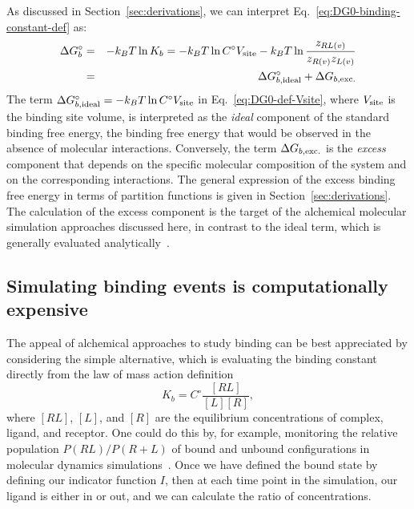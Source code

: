 \documentclass[9pt,bestpractices]{livecoms}
\begin{document}
As discussed in Section~\ref{sec:derivations}, we can interpret Eq.~\ref{eq:DG0-binding-constant-def} as: 
\begin{eqnarray}
  \Delta G^\circ_b &=&  - k_B T \ln K_b = - k_B T \ln C^\circ V_{\rm site} - k_B T \ln \frac{z_{RL(v)}}{z_{R(v)} z_{L(v)}} \\
{\rm \ }  &=& \Delta G^\circ_{b,{\rm ideal}} + \Delta G_{b,{\rm exc.}} \label{eq:DG0-def-Vsite}
\end{eqnarray}
The term $\Delta G^\circ_{b,{\rm ideal}} = - k_B T \ln C^\circ V_{\rm site}$ in Eq.~\ref{eq:DG0-def-Vsite}, where $V_{\rm site}$ is the binding site volume,   is interpreted as the \emph{ideal} component of the standard binding free energy, the binding free energy that would be observed in the absence of molecular interactions. Conversely, the term $\Delta G_{b,{\rm exc.}}$ is the \emph{excess} component that depends on the specific molecular composition of the system and on the corresponding interactions. The general expression of the excess binding free energy in terms of partition functions is given in Section~\ref{sec:derivations}. The calculation of the excess component is the target of the alchemical molecular simulation approaches discussed here, in contrast to the ideal term, which is generally evaluated analytically~\cite{boresch2003absolute}.

\subsection{Simulating binding events is computationally expensive}

The appeal of alchemical approaches to study binding can be best appreciated by considering the simple alternative, which is evaluating the binding constant directly from the law of mass action definition
\begin{equation}\label{eq:law-mass-action}
 K_b = C^{\circ}\frac{[RL]}{[L][R]},
\end{equation}
where $[RL]$, $[L]$, and $[R]$ are the equilibrium concentrations of complex, ligand, and receptor. One could do this by, for example, monitoring the relative population $P(RL)/P(R+L)$ of bound and unbound configurations in molecular dynamics simulations~\cite{jong2011determining,pan2017quantitative}. Once we have defined the bound state by defining our indicator
function $I$, then at each time point in the simulation, our ligand is
either in or out, and we can calculate the ratio of concentrations.
\end{document}
